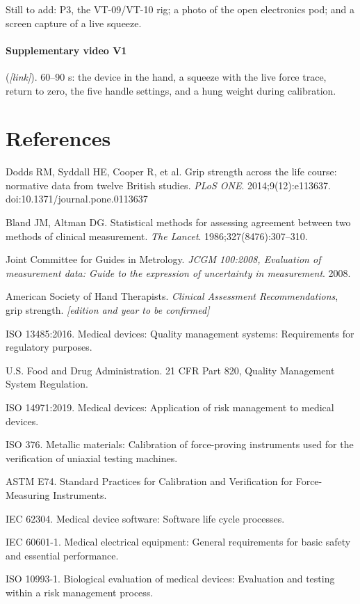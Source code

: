 \documentclass[10pt,a4paper]{article}
\begin{document}
\noindent Still to add: P3, the VT-09/VT-10 rig; a photo of the open electronics pod; and a screen capture of a live squeeze.

\paragraph{Supplementary video V1} (\textit{[link]}). 60–90 s: the device in the hand, a squeeze with the live force trace, return to zero, the five handle settings, and a hung weight during calibration.

\section*{References}
\begin{enumerate}[label={[\arabic*]},leftmargin=2.2em,itemsep=2pt]\small
\item Dodds RM, Syddall HE, Cooper R, et al. Grip strength across the life course: normative data from twelve British studies. \textit{PLoS ONE}. 2014;9(12):e113637. doi:10.1371/journal.pone.0113637
\item Bland JM, Altman DG. Statistical methods for assessing agreement between two methods of clinical measurement. \textit{The Lancet}. 1986;327(8476):307–310.
\item Joint Committee for Guides in Metrology. \textit{JCGM 100:2008, Evaluation of measurement data: Guide to the expression of uncertainty in measurement}. 2008.
\item American Society of Hand Therapists. \textit{Clinical Assessment Recommendations}, grip strength. \textit{[edition and year to be confirmed]}
\item ISO 13485:2016. Medical devices: Quality management systems: Requirements for regulatory purposes.
\item U.S. Food and Drug Administration. 21 CFR Part 820, Quality Management System Regulation.
\item ISO 14971:2019. Medical devices: Application of risk management to medical devices.
\item ISO 376. Metallic materials: Calibration of force-proving instruments used for the verification of uniaxial testing machines.
\item ASTM E74. Standard Practices for Calibration and Verification for Force-Measuring Instruments.
\item IEC 62304. Medical device software: Software life cycle processes.
\item IEC 60601-1. Medical electrical equipment: General requirements for basic safety and essential performance.
\item ISO 10993-1. Biological evaluation of medical devices: Evaluation and testing within a risk management process.
\end{enumerate}
\end{document}
